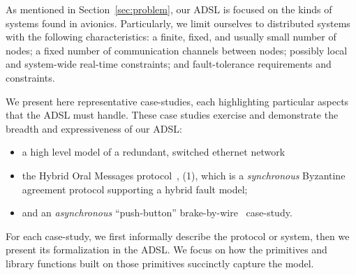 
As mentioned in Section~\ref{sec:problem}, our ADSL is focused on the kinds of
systems found in avionics. Particularly, we limit ourselves to distributed
systems with the following characteristics: a finite, fixed, and usually small
number of nodes; a fixed number of communication channels between nodes;
possibly local and system-wide real-time constraints; and fault-tolerance
requirements and constraints.

We present here representative case-studies, each highlighting particular
aspects that the ADSL must handle. These case studies exercise and demonstrate
the breadth and expressiveness of our ADSL:


\begin{itemize}
\item a high level model of a redundant, switched ethernet network
\item the Hybrid Oral Messages protocol~\cite{Lincoln-Rushby}, \OMH(1), which is a
    \emph{synchronous} Byzantine agreement protocol supporting a hybrid fault model;
\item and an \emph{asynchronous} ``push-button'' brake-by-wire~\cite{a320ibiza} case-study.
\end{itemize}

For each case-study, we first informally describe the protocol or system, then
we present its formalization in the ADSL. We focus on how the primitives and
library functions built on those primitives succinctly capture the model.
